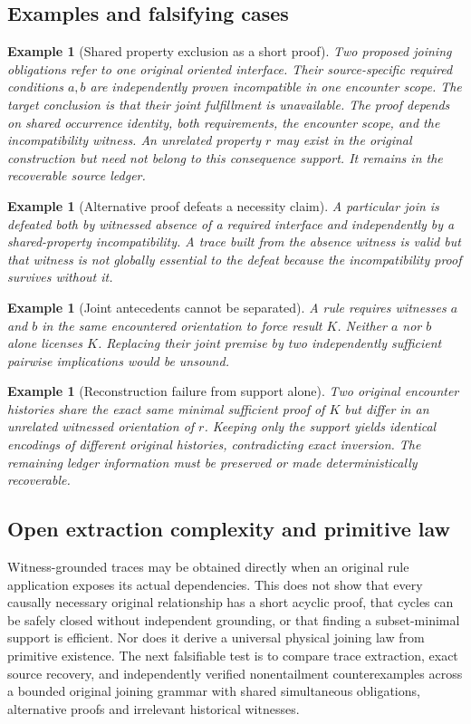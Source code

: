 \documentclass[11pt]{article}
\newtheorem{example}[definition]{Example}
\begin{document}
\subsection{Examples and falsifying cases}
\begin{example}[Shared property exclusion as a short proof]
Two proposed joining obligations refer to
one original oriented interface. Their
source-specific required conditions $a,b$
are independently proven incompatible
in one encounter scope. The target conclusion
is that their joint fulfillment is unavailable.
The proof depends on shared occurrence
identity, both requirements, the encounter
scope, and the incompatibility witness.
An unrelated property $r$ may exist in
the original construction but need not
belong to this consequence support.
It remains in the recoverable source ledger.
\end{example}

\begin{example}[Alternative proof defeats a necessity claim]
A particular join is defeated both by
witnessed absence of a required interface
and independently by a shared-property
incompatibility. A trace built from the
absence witness is valid but that witness
is not globally essential to the defeat
because the incompatibility proof survives
without it.
\end{example}

\begin{example}[Joint antecedents cannot be separated]
A rule requires witnesses $a$ \emph{and} $b$
in the same encountered orientation to
force result $K$. Neither $a$ nor $b$
alone licenses $K$. Replacing their joint
premise by two independently sufficient
pairwise implications would be unsound.
\end{example}

\begin{example}[Reconstruction failure from support alone]
Two original encounter histories share
the exact same minimal sufficient proof
of $K$ but differ in an unrelated witnessed
orientation of $r$. Keeping only the
support yields identical encodings of
different original histories, contradicting
exact inversion. The remaining ledger
information must be preserved or made
deterministically recoverable.
\end{example}

\subsection{Open extraction complexity and primitive law}
Witness-grounded traces may be obtained directly
when an original rule application exposes its
actual dependencies. This does not show that
every causally necessary original relationship
has a short acyclic proof, that cycles can
be safely closed without independent grounding,
or that finding a subset-minimal support is
efficient. Nor does it derive a universal
physical joining law from primitive existence.
The next falsifiable test is to compare
trace extraction, exact source recovery,
and independently verified nonentailment
counterexamples across a bounded original
joining grammar with shared simultaneous
obligations, alternative proofs and
irrelevant historical witnesses.
\end{document}
